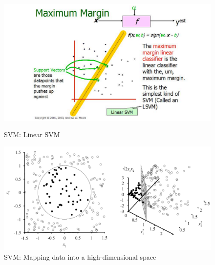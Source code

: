 \documentclass[a4paper]{article}
\begin{document}
\begin{figure}[H]
    \centering
    \begin{minipage}{0.48\textwidth}
      \centering
      \includegraphics[width=\linewidth]{./images/SVM_Linear SVM.png}
      \caption{SVM: Linear SVM\cite{ref_svm4}}
      \label{fig.SVM_Linear SVM[Illustration of Linear SVM. (Taken from Andrew W. Moore slides 2003)]}
    \end{minipage}\hfill
    \begin{minipage}{0.48\textwidth}
      \centering
      \includegraphics[width=\linewidth]{./images/SVM_High-dimensional_Space.png}
      \caption{SVM: Mapping data into a high-dimensional space\cite{ref_svm2}}
      \label{fig.SVM_High-dimensional_Space}
    \end{minipage}
\end{figure}
\end{document}
